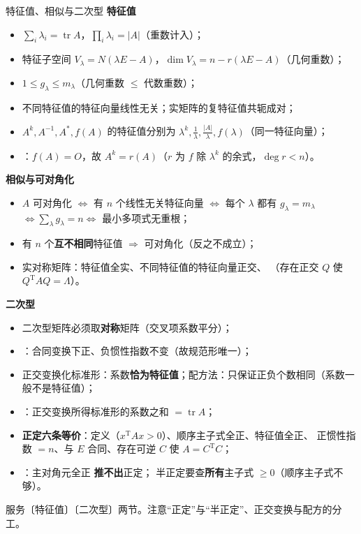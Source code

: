 \begin{fdeep}{特征值、相似与二次型}
\textbf{特征值}
\begin{itemize}[leftmargin=2.2em,itemsep=0.2em]
\item $\displaystyle\sum_i\lambda_i=\operatorname{tr}A$，$\displaystyle\prod_i\lambda_i=|A|$（重数计入）；
\item 特征子空间 $V_{\lambda}=N(\lambda E-A)$，$\dim V_{\lambda}=n-r(\lambda E-A)$（几何重数）；
\item $1\le g_{\lambda}\le m_{\lambda}$（几何重数 $\le$ 代数重数）；
\item 不同特征值的特征向量线性无关；实矩阵的复特征值共轭成对；
\item $A^{k},A^{-1},A^{*},f(A)$ 的特征值分别为 $\lambda^{k},\frac1\lambda,\frac{|A|}{\lambda},f(\lambda)$（同一特征向量）；
\item {}：$f(A)=O$，故 $A^{k}=r(A)$（$r$ 为 $f$ 除 $\lambda^{k}$ 的余式，$\deg r<n$）。
\end{itemize}
\textbf{相似与可对角化}
\begin{itemize}[leftmargin=2.2em,itemsep=0.2em]
\item $A$ 可对角化 $\iff$ 有 $n$ 个线性无关特征向量 $\iff$ 每个 $\lambda$ 都有 $g_{\lambda}=m_{\lambda}$
      $\iff\sum_{\lambda}g_{\lambda}=n\iff$ 最小多项式无重根；
\item 有 $n$ 个\textbf{互不相同}特征值 $\Rightarrow$ 可对角化（反之不成立）；
\item 实对称矩阵：特征值全实、不同特征值的特征向量正交、
      （存在正交 $Q$ 使 $Q^{\mathrm T}AQ=\Lambda$）。
\end{itemize}
\textbf{二次型}
\begin{itemize}[leftmargin=2.2em,itemsep=0.2em]
\item 二次型矩阵必须取\textbf{对称}矩阵（交叉项系数平分）；
\item {}：合同变换下正、负惯性指数不变（故规范形唯一）；
\item 正交变换化标准形：系数\textbf{恰为特征值}；配方法：只保证正负个数相同（系数一般不是特征值）；
\item {}：正交变换所得标准形的系数之和 $=\operatorname{tr}A$；
\item \textbf{正定六条等价}：定义（$x^{\mathrm T}Ax>0$）、顺序主子式全正、特征值全正、
      正惯性指数 $=n$、与 $E$ 合同、存在可逆 $C$ 使 $A=C^{\mathrm T}C$；
\item {}：主对角元全正 \textbf{推不出}正定；
      半正定要查\textbf{所有}主子式 $\ge0$（顺序主子式不够）。
\end{itemize}
\fbref{}服务〔特征值〕〔二次型〕两节。注意“正定”与“半正定”、正交变换与配方的分工。
\end{fdeep}

